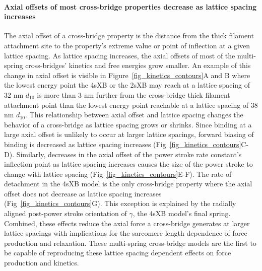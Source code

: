 \documentclass[10pt]{article}
\begin{document}
\paragraph{Axial offsets of most cross-bridge properties decrease as lattice spacing increases} %
The axial offset of a cross-bridge property is the distance from the thick filament attachment site to the property's extreme value or point of inflection at a given lattice spacing. 
As lattice spacing increases, the axial offsets of most of the multi-spring cross-bridges' kinetics and free energies grow smaller.
An example of this change in axial offset is visible in Figure~\ref{fig_kinetics_contours}A and B where the lowest energy point the 4sXB or the 2sXB may reach at a lattice spacing of 32 nm $d_{10}$ is more than 3 nm further from the cross-bridge thick filament attachment point than the lowest energy point reachable at a lattice spacing of 38 nm $d_{10}$. 
This relationship between axial offset and lattice spacing changes the behavior of a cross-bridge as lattice spacing grows or shrinks.
Since binding at a large axial offset is unlikely to occur at larger lattice spacings, forward biasing of binding is decreased as lattice spacing increases (Fig~\ref{fig_kinetics_contours}C-D). 
Similarly, decreases in the axial offset of the power stroke rate constant's inflection point as lattice spacing increases causes the size of the power stroke to change with lattice spacing (Fig~\ref{fig_kinetics_contours}E-F).
The rate of detachment in the 4sXB model is the only cross-bridge property where the axial offset does not decrease as lattice spacing increases (Fig~\ref{fig_kinetics_contours}G). 
This exception is explained by the radially aligned post-power stroke orientation of $\gamma$, the 4sXB model's final spring. 
Combined, these effects reduce the axial force a cross-bridge generates at larger lattice spacings with implications for the sarcomere length dependence of force production and relaxation. 
These multi-spring cross-bridge models are the first to be capable of reproducing these lattice spacing dependent effects on force production and kinetics.
\end{document}
